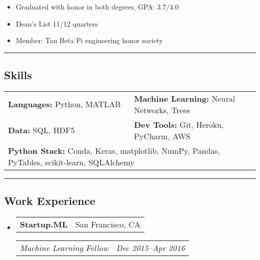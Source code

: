 \documentclass[10pt,letterpaper]{article}
\makeatletter
\newenvironment{indentsection}[1]%
{\begin{list}{}%
	{\setlength{\leftmargin}{#1}}%
	\item[]%
}
{\end{list}}
\newcommand{\headerrow}[2]
{\begin{tabular*}{\linewidth}{l@{\extracolsep{\fill}}r}
	#1 &
	#2 \\
\end{tabular*}}
\makeatother
\begin{document}
\begin{indentsection}{\parindent}
	\begin{itemize}
		\parskip=-0.1em
		\item Graduated with honor in both degrees,  GPA: 3.7/4.0
		\item Dean's List 11/12 quarters
		\item Member: Tau Beta Pi engineering honor society
	\end{itemize}
\end{indentsection}

\hrule
\subsection*{Skills}
\begin{indentsection}{\parindent}
\begin{tabular}{p{0.5\linewidth}   p{0.5\linewidth} } 
	\textbf{Languages:} Python, MATLAB
	& \textbf{Machine Learning:} Neural Networks, Trees \\

	\textbf{Data:} SQL, HDF5
	& \textbf{Dev Tools:}  Git, Heroku, PyCharm, AWS \\  
	
	
	\multicolumn{2}{l}{\textbf{Python Stack:} Conda, Keras, matplotlib, NumPy, Pandas, PyTables, scikit-learn, SQLAlchemy} \\
\end{tabular}
\end{indentsection}

\hrule
\subsection*{Work Experience}
\begin{itemize}
	\parskip=-0.1em
	\item
	\headerrow
		{\textbf{Startup.ML}}
		{San Francisco, CA}
	\headerrow
		{\emph{Machine Learning Fellow}}
		{\emph{Dec 2015--Apr 2016}}
\end{itemize}
\end{document}
